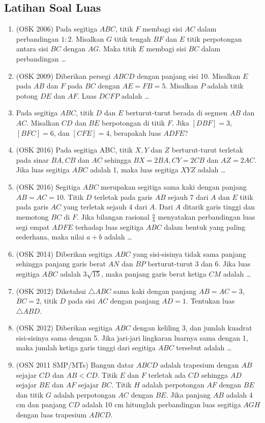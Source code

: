 \subsection{Latihan Soal Luas}
\begin{enumerate}
\item (OSK 2006) Pada segitiga $ABC$, titik $F$ membagi sisi $AC$ dalam perbandingan $1 : 2$. Misalkan $G$ titik tengah $BF$ dan $E$ titik perpotongan antara sisi $BC$ dengan $AG$. Maka titik $E$ membagi sisi $BC$ dalam perbandingan \dots

\item (OSK 2009) Diberikan persegi $ABCD$ dengan panjang sisi 10. Misalkan $E$ pada $AB$ dan $F$ pada $BC$ dengan $AE = FB = 5$. Misalkan $P$ adalah titik potong $DE$ dan $AF$. Luas $DCFP$ adalah \dots

\item Pada segitiga $ABC$, titik $D$ dan $E$ berturut-turut berada di segmen $AB$ dan $AC$. Misalkan $CD$ dan $BE$ berpotongan di titik $F$. Jika $[DBF]=3$, $[BFC]=6$, dan $[CFE]=4$, berapakah luas $ADFE$?

\item (OSK 2016) Pada segitiga ABC, titik $X, Y$ dan $Z$ berturut-turut terletak pada sinar $BA, CB$ dan $AC$ sehingga $BX = 2BA, CY = 2CB$ dan $AZ = 2AC$. Jika luas segitiga $ABC$ adalah 1, maka luas segitiga $XYZ$ adalah \dots

\item (OSK 2016) Segitiga $ABC$ merupakan segitiga sama kaki dengan panjang $AB = AC = 10 $. Titik $D$ terletak pada garis $AB$ sejauh $7 $ dari $A$ dan $E$ titik pada garis $AC$ yang terletak sejauh $4 $ dari $A$. Dari $A$ ditarik garis tinggi dan memotong $BC$ di $F$. Jika bilangan rasional $\frac{a}{b}$ menyatakan perbandingan luas segi empat $ADFE$ terhadap luas segitiga $ABC$ dalam bentuk yang paling sederhana, maka nilai $a + b$ adalah \dots

\item (OSK 2014) Diberikan segitiga $ABC$ yang sisi-sisinya tidak sama panjang sehingga panjang garis berat $AN$ dan $BP$ berturut-turut 3 dan 6. Jika luas segitiga $ABC$ adalah $3\sqrt{15}$, maka panjang garis berat ketiga $CM$ adalah \dots

\item (OSK 2012) Diketahui $\triangle ABC$ sama kaki dengan panjang $AB = AC = 3$, $BC = 2$, titik $D$ pada sisi $AC$ dengan panjang $AD = 1$. Tentukan luas $\triangle ABD$.

\item (OSK 2012) Diberikan segitiga $ABC$ dengan keliling 3, dan jumlah kuadrat sisi-sisinya sama dengan 5. Jika jari-jari lingkaran luarnya sama dengan 1, maka jumlah ketiga garis tinggi dari segitiga $ABC$ tersebut adalah \dots

\item (OSN 2011 SMP/MTs) Bangun datar $ABCD$ adalah trapesium dengan $AB$ sejajar $CD$ dan $AB < CD$. Titik $E$ dan $F$ terletak ada $CD$ sehingga $AD$ sejajar $BE$ dan $AF$ sejajar $BC$. Titik $H$  adalah perpotongan $AF$ dengan $BE$ dan titik $G$ adalah  perpotongan $AC$ dengan $BE$. Jika panjang $AB$ adalah 4 cm dan panjang $CD$ adalah 10 cm hitunglah perbandingan luas  segitiga $AGH$ dengan luas trapesium $ABCD$. 
\end{enumerate}